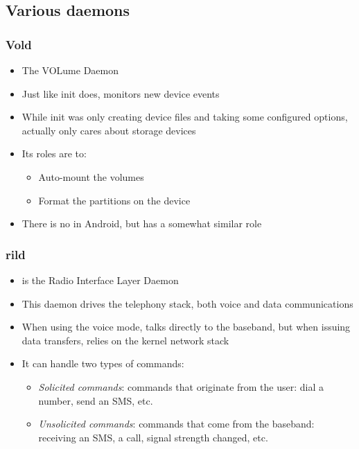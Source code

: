 \subsection{Various daemons}
\begin{frame}
  \frametitle{Vold}
  \begin{itemize}
  \item The VOLume Daemon
  \item Just like init does, monitors new device events
  \item While init was only creating device files and taking some
    configured options,  actually only cares about storage
    devices
  \item Its roles are to:
    \begin{itemize}
    \item Auto-mount the volumes
    \item Format the partitions on the device
    \end{itemize}
  \item There is no  in Android, but
     has a somewhat similar role
  \end{itemize}
\end{frame}

\begin{frame}
  \frametitle{rild}
  \begin{itemize}
  \item {} is the Radio Interface Layer Daemon
  \item This daemon drives the telephony stack, both voice and data
    communications
  \item When using the voice mode, talks directly to the baseband, but
    when issuing data transfers, relies on the kernel network stack
  \item It can handle two types of commands:
    \begin{itemize}
    \item \textit{Solicited commands}: commands that originate from
      the user: dial a number, send an SMS, etc.
    \item \textit{Unsolicited commands}: commands that come from the
      baseband: receiving an SMS, a call, signal strength changed, etc.
    \end{itemize}
  \end{itemize}
\end{frame}

